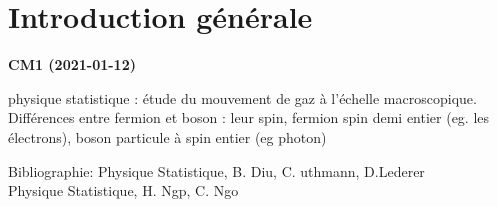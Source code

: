 \documentclass[12pt,a4paper]{report}
\author{Malo Kerebel}
\begin{document}
\begin{titlepage}

\end{titlepage}

\tableofcontents

\chapter{Introduction générale}
\begin{center}
\textbf{CM1 (2021-01-12)}
\end{center}

physique statistique : étude du mouvement de gaz à l'échelle macroscopique.
Différences entre fermion et boson : leur spin, fermion spin demi entier (eg. les électrons), boson particule à spin entier (eg photon)\par
\quad \par
Bibliographie:
Physique Statistique, B. Diu, C. uthmann, D.Lederer\\
Physique Statistique, H. Ngp, C. Ngo\par
\quad \par
\end{document}
